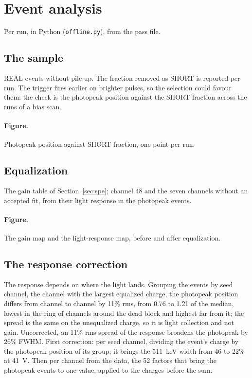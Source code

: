 \documentclass[11pt]{article}
\newcommand{\code}[1]{\texttt{#1}}
\begin{document}
\section{Event analysis}
\label{sec:analysis}

Per run, in Python (\code{offline.py}), from the pass file.

\subsection{The sample}

REAL events without pile-up. The fraction removed as SHORT is reported
per run. The trigger fires earlier on brighter pulses, so the selection
could favour them: the check is the photopeak position against the SHORT
fraction across the runs of a bias scan.

\paragraph{Figure.} Photopeak position against SHORT fraction, one point
per run.

\subsection{Equalization}
\label{sec:equalization}

The gain table of Section~\ref{sec:spe}; channel 48 and the seven
channels without an accepted fit, from their light response in the
photopeak events.

\paragraph{Figure.} The gain map and the light-response map, before and
after equalization.

\subsection{The response correction}
\label{sec:response}

The response depends on where the light lands. Grouping the events by
seed channel, the channel with the largest equalized charge, the
photopeak position differs from channel to channel by 11\% rms, from 0.76
to 1.21 of the median, lowest in the ring of channels around the dead
block and highest far from it; the spread is the same on the unequalized
charge, so it is light collection and not gain. Uncorrected, an 11\% rms
spread of the response broadens the photopeak by 26\% FWHM. First
correction: per seed channel, dividing the event's charge by the photopeak
position of its group; it brings the 511~keV width from 46 to 22\% at
41~V. Then per channel from the data, the 52 factors that bring the
photopeak events to one value, applied to the charges before the sum.
\end{document}
